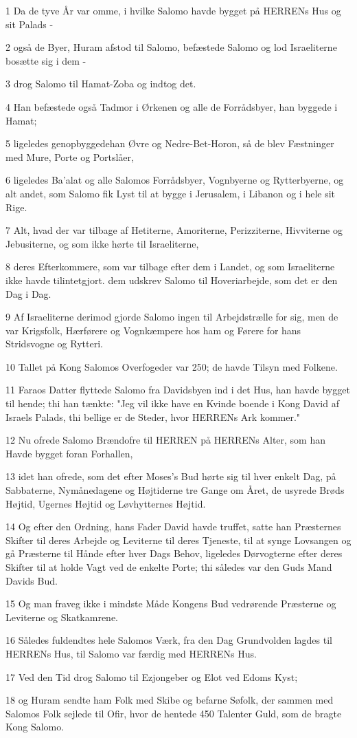 \par 1 Da de tyve År var omme, i hvilke Salomo havde bygget på HERRENs Hus og sit Palads -
\par 2 også de Byer, Huram afstod til Salomo, befæstede Salomo og lod Israeliterne bosætte sig i dem -
\par 3 drog Salomo til Hamat-Zoba og indtog det.
\par 4 Han befæstede også Tadmor i Ørkenen og alle de Forrådsbyer, han byggede i Hamat;
\par 5 ligeledes genopbyggedehan Øvre og Nedre-Bet-Horon, så de blev Fæstninger med Mure, Porte og Portslåer,
\par 6 ligeledes Ba'alat og alle Salomos Forrådsbyer, Vognbyerne og Rytterbyerne, og alt andet, som Salomo fik Lyst til at bygge i Jerusalem, i Libanon og i hele sit Rige.
\par 7 Alt, hvad der var tilbage af Hetiterne, Amoriterne, Perizziterne, Hivviterne og Jebusiterne, og som ikke hørte til Israeliterne,
\par 8 deres Efterkommere, som var tilbage efter dem i Landet, og som Israeliterne ikke havde tilintetgjort. dem udskrev Salomo til Hoveriarbejde, som det er den Dag i Dag.
\par 9 Af Israeliterne derimod gjorde Salomo ingen til Arbejdstrælle for sig, men de var Krigsfolk, Hærførere og Vognkæmpere hos ham og Førere for hans Stridsvogne og Rytteri.
\par 10 Tallet på Kong Salomos Overfogeder var 250; de havde Tilsyn med Folkene.
\par 11 Faraos Datter flyttede Salomo fra Davidsbyen ind i det Hus, han havde bygget til hende; thi han tænkte: "Jeg vil ikke have en Kvinde boende i Kong David af Israels Palads, thi bellige er de Steder, hvor HERRENs Ark kommer."
\par 12 Nu ofrede Salomo Brændofre til HERREN på HERRENs Alter, som han Havde bygget foran Forhallen,
\par 13 idet han ofrede, som det efter Moses's Bud hørte sig til hver enkelt Dag, på Sabbaterne, Nymånedagene og Højtiderne tre Gange om Året, de usyrede Brøds Højtid, Ugernes Højtid og Løvhytternes Højtid.
\par 14 Og efter den Ordning, hans Fader David havde truffet, satte han Præsternes Skifter til deres Arbejde og Leviterne til deres Tjeneste, til at synge Lovsangen og gå Præsterne til Hånde efter hver Dags Behov, ligeledes Dørvogterne efter deres Skifter til at holde Vagt ved de enkelte Porte; thi således var den Guds Mand Davids Bud.
\par 15 Og man fraveg ikke i mindste Måde Kongens Bud vedrørende Præsterne og Leviterne og Skatkamrene.
\par 16 Således fuldendtes hele Salomos Værk, fra den Dag Grundvolden lagdes til HERRENs Hus, til Salomo var færdig med HERRENs Hus.
\par 17 Ved den Tid drog Salomo til Ezjongeber og Elot ved Edoms Kyst;
\par 18 og Huram sendte ham Folk med Skibe og befarne Søfolk, der sammen med Salomos Folk sejlede til Ofir, hvor de hentede 450 Talenter Guld, som de bragte Kong Salomo.

